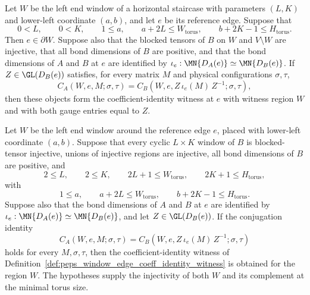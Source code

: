 \begin{definition}
    \label{def:peps_window_edge_coeff_identity_witness}
    \leanok
    Let $W$ be the left end window of a horizontal staircase with parameters
    $(L,K)$ and lower-left coordinate $(a,b)$, and let $e$ be its reference
    edge.  Suppose that
    \[
        0<L,\qquad 0<K,\qquad
        1\le a,\qquad
        a+2L\le W_{\mathrm{torus}},\qquad
        b+2K-1\le H_{\mathrm{torus}}.
    \]
    Then $e\in\partial W$.  Suppose also that the blocked tensors of $B$ on
    $W$ and $V\setminus W$ are injective, that all bond dimensions of $B$ are
    positive, and that the bond dimensions of $A$ and $B$ at $e$ are
    identified by $\iota_e:\MN{D_A(e)}\simeq\MN{D_B(e)}$.  If
    $Z\in\GL(D_B(e))$ satisfies, for every matrix $M$ and physical
    configurations $\sigma,\tau$,
    \[
        C_A(W,e,M;\sigma,\tau)
        =
        C_B(W,e,Z\,\iota_e(M)\,Z^{-1};\sigma,\tau),
    \]
    then these objects form the coefficient-identity witness at $e$ with
    witness region $W$ and with both gauge entries equal to $Z$.
\end{definition}

\begin{definition}
    \label{def:peps_window_edge_coeff_identity_witness_of_hypotheses}
    \leanok
    Let $W$ be the left end window around the reference edge $e$, placed with
    lower-left coordinate $(a,b)$.  Suppose that every cyclic $L\times K$
    window of $B$ is blocked-tensor injective, unions of injective regions are
    injective, all bond dimensions of $B$ are positive, and
    \[
        2\le L,\qquad 2\le K,\qquad
        2L+1\le W_{\mathrm{torus}},\qquad
        2K+1\le H_{\mathrm{torus}},
    \]
    with
    \[
        1\le a,\qquad
        a+2L\le W_{\mathrm{torus}},\qquad
        b+2K-1\le H_{\mathrm{torus}}.
    \]
    Suppose also that the bond dimensions of $A$ and $B$ at $e$ are
    identified by $\iota_e:\MN{D_A(e)}\simeq\MN{D_B(e)}$, and let
    $Z\in\GL(D_B(e))$.  If the conjugation identity
    \[
        C_A(W,e,M;\sigma,\tau)
        =
        C_B(W,e,Z\,\iota_e(M)\,Z^{-1};\sigma,\tau)
    \]
    holds for every $M,\sigma,\tau$, then the coefficient-identity witness of
    Definition~\ref{def:peps_window_edge_coeff_identity_witness} is obtained
    for the region $W$.  The hypotheses supply the injectivity of both $W$ and
    its complement at the minimal torus size.
\end{definition}



